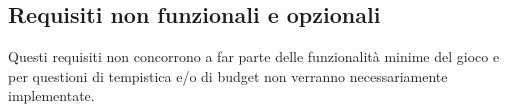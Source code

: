 \subsection{Requisiti non funzionali e opzionali}

\textsf{\small Questi requisiti non concorrono a far parte delle funzionalità minime del gioco e per questioni di tempistica e/o di budget non verranno necessariamente implementate.}\\

